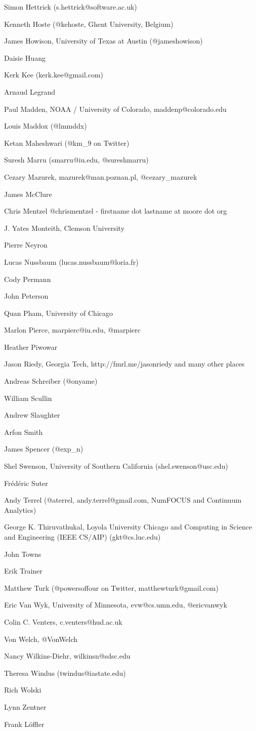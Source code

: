 \documentclass[11pt, oneside]{amsart}
\begin{document}
Simon Hettrick (s.hettrick@software.ac.uk)

Kenneth Hoste (@kehoste, Ghent University, Belgium)

James Howison, University of Texas at Austin (@jameshowison)

Daisie Huang

Kerk Kee (kerk.kee@gmail.com)

Arnaud Legrand

Paul Madden, NOAA / University of Colorado, maddenp@colorado.edu

Louis Maddox (@lmmddx)

Ketan Maheshwari (@km\_9 on Twitter)

Suresh Marru (smarru@iu.edu, @sureshmarru) 

Cezary Mazurek, mazurek@man.poznan.pl, @cezary\_mazurek

James McClure

Chris Mentzel @chrismentzel - firstname dot lastname at moore dot org

J. Yates Monteith, Clemson University

Pierre Neyron

Lucas Nussbaum (lucas.nussbaum@loria.fr)

Cody Permann

John Peterson

Quan Pham, University of Chicago

Marlon Pierce, marpierc@iu.edu, @marpierc

Heather Piwowar

Jason Riedy, Georgia Tech, http://fmrl.me/jasonriedy and many other places

Andreas Schreiber (@onyame)

William Scullin

Andrew Slaughter

Arfon Smith

James Spencer (@exp\_n)

Shel Swenson, University of Southern California (shel.swenson@usc.edu)

Fr\'{e}d\'{e}ric Suter

Andy Terrel (@aterrel, andy.terrel@gmail.com, NumFOCUS and Continuum Analytics)

George K. Thiruvathukal, Loyola University Chicago and Computing in Science and Engineering (IEEE CS/AIP) (gkt@cs.luc.edu)

John Towns

Erik Trainer

Matthew Turk (@powersoffour on Twitter, matthewturk@gmail.com)

Eric Van Wyk, University of Minnesota, evw@cs.umn.edu, @ericvanwyk

Colin C. Venters, c.venters@hud.ac.uk

Von Welch, @VonWelch

Nancy Wilkins-Diehr, wilkinsn@sdsc.edu

Theresa Windus (twindus@iastate.edu)

Rich Wolski

Lynn Zentner

Frank Löffler






\end{document}
